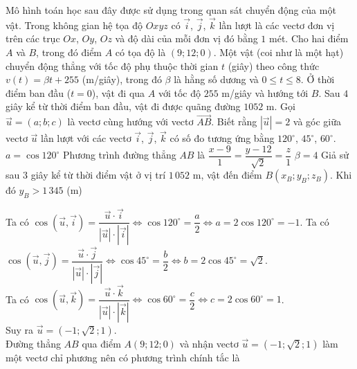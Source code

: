 \begin{ex}%
	Mô hình toán học sau đây được sử dụng trong quan sát chuyển động của một vật. Trong không gian hệ tọa độ $Oxyz$ có $\overrightarrow{i}$, $\overrightarrow{j}$, $\overrightarrow{k}$ lần lượt là các vectơ đơn vị trên các trục $Ox$, $Oy$, $Oz$ và độ dài của mỗi đơn vị đó bằng $1$ mét. Cho hai điểm $A$ và $B$, trong đó điểm $A$ có tọa độ là $(9;12;0)$. Một vật (coi như là một hạt) chuyển động thẳng với tốc độ phụ thuộc thời gian $t$ (giây) theo công thức $v(t)=\beta t+255$ (m/giây), trong đó $\beta$ là hằng số dương và $0\leq t\leq 8$. Ở thời điểm ban đầu ($t=0$), vật đi qua $A$ với tốc độ $255$ m/giây và hướng tới $B$. Sau $4$ giây kể từ thời điểm ban đầu, vật đi được quãng đường $1052$ m. Gọi $\overrightarrow{u}=(a;b;c)$ là vectơ cùng hướng với vectơ $\overrightarrow{AB}$. Biết rằng $\left|\overrightarrow{u}\right|=2$ và góc giữa vectơ $\overrightarrow{u}$ lần lượt với các vectơ $\overrightarrow{i}$, $\overrightarrow{j}$, $\overrightarrow{k}$ có số đo tương ứng bằng $120^\circ$, $45^\circ$, $60^\circ$.
	\choiceTF
	{$a=\cos 120^\circ$}
	{Phương trình đường thẳng $AB$ là $\dfrac{x-9}{1}=\dfrac{y-12}{\sqrt{2}}=\dfrac{z}{1}$}
	{\True $\beta=4$}
	{Giả sử sau $3$ giây kể từ thời điểm vật ở vị trí $1\,052$ m, vật đến điểm $B\left(x_B;y_B;z_B\right)$. Khi đó $y_B>1\,345$ (m)}
	\loigiai
	{
		\begin{itemchoice}
			\itemch Ta có $\cos\left(\overrightarrow{u},\overrightarrow{i}\right)=\dfrac{\overrightarrow{u}\cdot\overrightarrow{i}}{\left|\overrightarrow{u}\right|\cdot\left|\overrightarrow{i}\right|} \Leftrightarrow \cos 120^\circ=\dfrac{a}{2} \Leftrightarrow a=2\cos 120^\circ=-1$.
			\itemch Ta có $\cos\left(\overrightarrow{u},\overrightarrow{j}\right)=\dfrac{\overrightarrow{u}\cdot\overrightarrow{j}}{\left|\overrightarrow{u}\right|\cdot\left|\overrightarrow{j}\right|} \Leftrightarrow \cos 45^\circ=\dfrac{b}{2} \Leftrightarrow b=2\cos 45^\circ=\sqrt{2}$. \\
			Ta có $\cos\left(\overrightarrow{u},\overrightarrow{k}\right)=\dfrac{\overrightarrow{u}\cdot\overrightarrow{k}}{\left|\overrightarrow{u}\right|\cdot\left|\overrightarrow{k}\right|} \Leftrightarrow \cos 60^\circ=\dfrac{c}{2} \Leftrightarrow c=2\cos 60^\circ=1$. \\
			Suy ra $\overrightarrow{u}=\left(-1;\sqrt{2};1\right)$. \\
			Đường thẳng $AB$ qua điểm $A(9;12;0)$ và nhận vectơ $\overrightarrow{u}=\left(-1;\sqrt{2};1\right)$ làm một vectơ chỉ phương nên có phương trình chính tắc là

\end{itemchoice}}
\end{ex}
